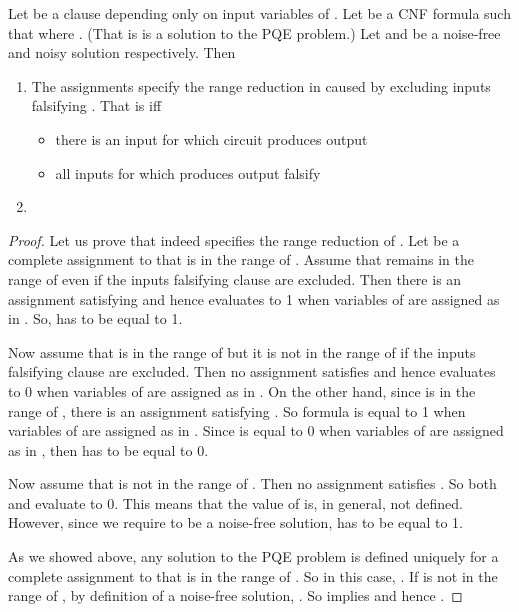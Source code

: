 \begin{proposition}
Let  be a clause depending only on input variables of .  Let
 be a CNF formula such that  where . (That is  is a solution
to the PQE problem.)  Let  and   be  a noise-free and noisy 
solution respectively.  Then
\begin{enumerate}
\item The assignments   specify the range reduction
  in  caused by excluding inputs falsifying . That is 
  iff
\begin{itemize}
   \item there is an input  for which circuit  produces
   output  
   \item all inputs for which  produces
   output  falsify 
\end{itemize}
\item {}
\end{enumerate}
\end{proposition}
\begin{proof}
 Let us prove that  indeed specifies the range
reduction of . Let  be a complete assignment to  that is
in the range of .  Assume that  remains in the range of 
even if the inputs falsifying clause  are excluded. Then there is
an assignment  satisfying  and
hence  evaluates to 1 when variables of  are
assigned as in . So,  has to be equal to 1.

Now assume that  is in the range of  but it is not in the
range of  if the inputs falsifying clause  are excluded. Then no
assignment  satisfies  and
hence  evaluates to 0 when variables of  are
assigned as in . On the other hand, since  is in the
range of , there is an assignment 
satisfying .  So formula  is equal to 1 when variables
of  are assigned as in . Since  is
equal to 0 when variables of  are assigned as in , then
 has to be equal to 0.

 Now assume that  is not in the range of . Then no
 assignment  satisfies . So
 both  and  evaluate to 0. This means
 that the value of  is, in general, not defined. However,
 since we require  to be a noise-free solution,  has to
 be equal to 1.

 As we showed above, any solution to the PQE
problem is defined uniquely for a complete assignment  to 
that is in the range of . So in this case,
.  If  is not in the range of , by
definition of a noise-free solution, .  So
 implies   and hence .
\end{proof}

